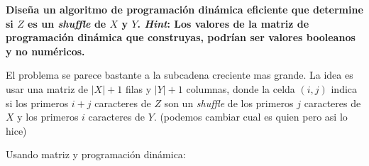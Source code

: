 \textbf{Dise\~na un algoritmo de programaci\'on din\'amica eficiente que determine si $Z$ es un \textit{shuffle} de $X$ y $Y$. \textit{Hint}: Los valores de la matriz de programaci\'on din\'amica que construyas, podr\'ian ser valores booleanos y no num\'ericos.}\vspace{.2cm}

El problema se parece bastante a la subcadena creciente mas grande.
La idea es usar una matriz de $|X|+1$ filas y $|Y|+1$ columnas, 
donde la celda $(i,j)$ indica si los primeros $i+j$ caracteres de $Z$
son un \textit{shuffle} de los primeros $j$ caracteres de $X$ y 
los primeros $i$ caracteres de $Y$. (podemos cambiar cual es quien pero asi lo hice) \vspace{.2cm}
    
\textcolor{bibi}{Usando matriz y programaci\'on din\'amica:}\vspace{.2cm}
